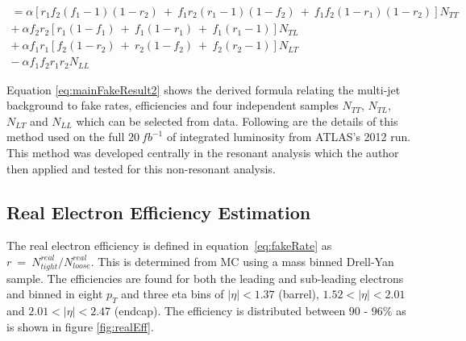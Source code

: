 \begin{equation} \label{eq:mainFakeResult2}
\begin{aligned}
   =\alpha[r_{1}f_{2}(f_{1}-1)(1-r_{2})~+~f_{1}r_{2}(r_{1}-1)(1-f_{2})~+~f_{1}f_{2}(1-r_{1})(1-r_{2})]N_{TT} \\
   +~\alpha f_{2}r_{2}[r_{1}(1-f_{1})~+~f_{1}(1-r_{1})~+~f_{1}(r_{1}-1)]N_{TL} \\
   +~\alpha f_{1}r_{1}[f_{2}(1-r_{2})~+~r_{2}(1-f_{2})~+~f_{2}(r_{2}-1)]N_{LT} \\
   -~\alpha f_{1}f_{2}r_{1}r_{2}N_{LL}
\end{aligned}
\end{equation}

Equation \ref{eq:mainFakeResult2} shows the derived formula relating the multi-jet background to fake rates, efficiencies and four independent samples $N_{TT}$, $N_{TL}$, $N_{LT}$ and $N_{LL}$ which can be selected from data. Following are the details of this method used on the full $20~fb^{-1}$ of integrated luminosity from ATLAS's 2012 run. This method was developed centrally in the resonant analysis which the author then applied and tested for this non-resonant analysis.


\subsection{Real Electron Efficiency Estimation}

The real electron efficiency is defined in equation~\ref{eq:fakeRate} as $r~=~N^{real}_{tight}/N^{real}_{loose}$. This is determined from MC using a mass binned Drell-Yan sample. The efficiencies are found for both the leading and sub-leading electrons and binned in eight $p_{T}$ and three eta bins of $|\eta|<1.37$ (barrel), $1.52<|\eta|<2.01$ and $2.01<|\eta|<2.47$ (endcap). The efficiency is distributed between $90$ - $96\%$ as is shown in figure \ref{fig:realEff}.

